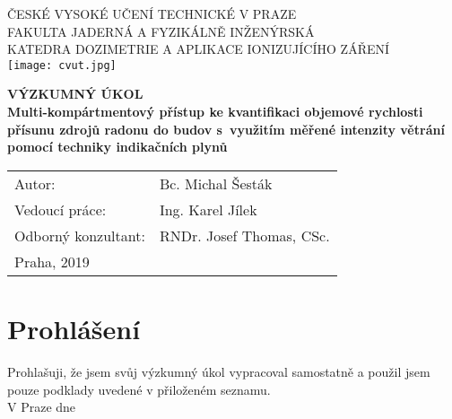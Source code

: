 \begin{center}
{\LARGE ČESKÉ VYSOKÉ UČENÍ TECHNICKÉ V PRAZE\\}
	\vspace{10pt}
{\large FAKULTA JADERNÁ A FYZIKÁLNĚ INŽENÝRSKÁ\\}
{\large KATEDRA DOZIMETRIE A APLIKACE IONIZUJÍCÍHO ZÁŘENÍ\\}
	\vspace{40pt}
    \texttt{[image: cvut.jpg]}

	\vspace{40pt}
{\Huge \textbf{VÝZKUMNÝ ÚKOL\\}}
	\vspace{10pt}
{\LARGE \textbf{Multi-kompártmentový přístup ke kvantifikaci  objemové rychlosti přísunu zdrojů radonu do budov s využitím měřené intenzity větrání pomocí techniky indikačních plynů\\}}
	\vspace*{\fill}

\end{center}
{\large
\begin{tabular}{p{5cm} p{8cm}}
Autor: & Bc. Michal Šesták\\
Vedoucí práce: & Ing. Karel Jílek\\
Odborný konzultant: & RNDr. Josef Thomas, CSc.\\
Praha, 2019 & \\
\end{tabular}
}
\newpage

\newpage
\vspace*{\fill}
\section*{Prohlášení}
Prohlašuji, že jsem svůj výzkumný úkol vypracoval samostatně a použil jsem pouze podklady uvedené v přiloženém seznamu.\\[10pt]
V Praze dne \\[10pt]
\newpage
\vspace*{\fill}
